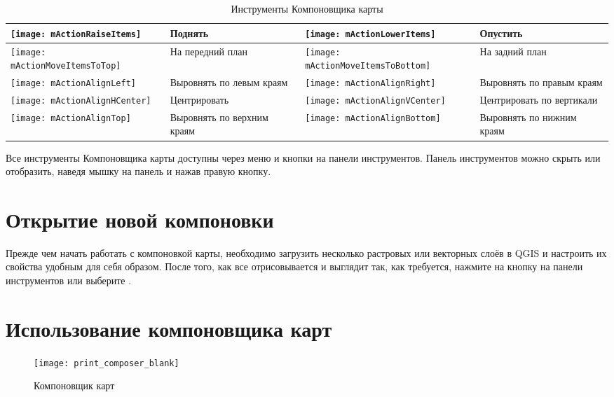\begin{table}[h]
\begin{tabular}{|m{1cm}|m{5.4cm}|m{1cm}|m{5.4cm}|}
 \hline \texttt{[image: mActionRaiseItems]} & Поднять &
 \texttt{[image: mActionLowerItems]} & Опустить \\
 \hline \texttt{[image: mActionMoveItemsToTop]} & На передний
 план &
 \texttt{[image: mActionMoveItemsToBottom]} & На задний
 план \\
 \hline \texttt{[image: mActionAlignLeft]} & Выровнять по
 левым краям &
 \texttt{[image: mActionAlignRight]} & Выровнять по правым
 краям \\
 \hline \texttt{[image: mActionAlignHCenter]} & Центрировать &
 \texttt{[image: mActionAlignVCenter]} & Центрировать по
 вертикали \\
 \hline \texttt{[image: mActionAlignTop]} & Выровнять по верхним
 краям &
 \texttt{[image: mActionAlignBottom]} & Выровнять по нижним
 краям \\
\hline
\end{tabular}
\caption{Инструменты Компоновщика карты}\label{tab:printcomposer_tools}
\end{table}

Все инструменты Компоновщика карты доступны через меню и кнопки на
панели инструментов. Панель инструментов можно скрыть или отобразить,
наведя мышку на панель и нажав правую кнопку.

\section{Открытие новой компоновки}\label{composertemplates}

Прежде чем начать работать с компоновкой карты, необходимо загрузить
несколько растровых или векторных слоёв в QGIS и настроить их свойства
удобным для себя образом. После того, как все отрисовывается и выглядит
так, как требуется, нажмите на кнопку
 на панели
инструментов или выберите  \arrow
{}.

\section{Использование компоновщика карт}\label{label_useprintcomposer}

\begin{figure}[ht]
   \centering
   \texttt{[image: print\_composer\_blank]}
   \caption{Компоновщик карт \wincaption}\label{fig:print_composer_blank}
\end{figure}

